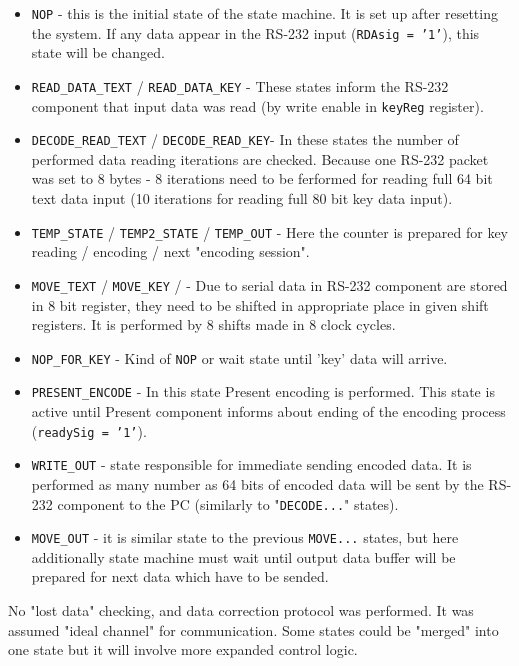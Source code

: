 \documentclass{gajewski}
\begin{document}
\begin{itemize}
    \item \texttt{NOP} - this is the initial state of the state machine. It is set up after resetting the system. If any data appear in the RS-232 input (\texttt{RDAsig = '1'}), this state will be changed.
    \item \texttt{READ\_DATA\_TEXT} / \texttt{READ\_DATA\_KEY} - These states inform the RS-232 component that input data was read (by write enable in \texttt{keyReg} register). 
    \item \texttt{DECODE\_READ\_TEXT} / \texttt{DECODE\_READ\_KEY}- In these states the number of performed data reading iterations are checked. Because one RS-232 packet was set to 8 bytes - 8 iterations need to be ferformed for reading full 64 bit text data input (10 iterations for reading full 80 bit key data input).
    \item \texttt{TEMP\_STATE} / \texttt{TEMP2\_STATE} / \texttt{TEMP\_OUT} - Here the counter is prepared for key reading / encoding / next "encoding session".
    \item \texttt{MOVE\_TEXT} / \texttt{MOVE\_KEY} / - Due to serial data in RS-232 component are stored in 8 bit register, they need to be shifted in appropriate place in given shift registers. It is performed by 8 shifts made in 8 clock cycles.
    \item \texttt{NOP\_FOR\_KEY} - Kind of \texttt{NOP} or wait state until 'key' data will arrive.
    \item \texttt{PRESENT\_ENCODE} - In this state Present encoding is performed. This state is active until Present component informs about ending of the encoding process (\texttt{readySig = '1'}).
    \item \texttt{WRITE\_OUT} - state responsible for immediate sending encoded data. It is performed as many number as 64 bits of encoded data will be sent by the RS-232 component to the PC (similarly to "\texttt{DECODE...}" states). 
    \item \texttt{MOVE\_OUT} - it is similar state to the previous \texttt{MOVE...} states, but here additionally state machine must wait until output data buffer will be prepared for next data which have to be sended.
\end{itemize}
No "lost data" checking, and data correction protocol was performed. It was assumed "ideal channel" for communication. Some states could be "merged" into one state but it will involve more expanded control logic.

\newpage
\end{document}
